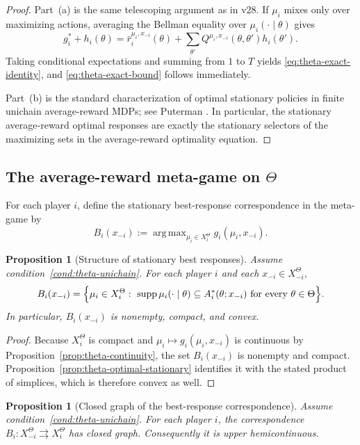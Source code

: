 \documentclass[11pt]{article}
\newtheorem{proposition}[theorem]{Proposition}
\theoremstyle{definition}
\newcommand{\1}{\mathbf{1}}
\DeclareMathOperator{\supp}{supp}
\DeclareMathOperator{\argmax}{arg\,max}
\begin{document}
\begin{proof}
Part~(a) is the same telescoping argument as in v28. If $\mu_i$ mixes only over maximizing actions, averaging the Bellman equality over $\mu_i(\cdot\mid \theta)$ gives
\[
g_i^*+h_i(\theta)
=
\bar r_i^{\mu_i,x_{-i}}(\theta)+\sum_{\theta'}Q^{\mu_i,x_{-i}}(\theta,\theta')h_i(\theta').
\]
Taking conditional expectations and summing from $1$ to $T$ yields \eqref{eq:theta-exact-identity}, and \eqref{eq:theta-exact-bound} follows immediately.

Part~(b) is the standard characterization of optimal stationary policies in finite unichain average-reward MDPs; see Puterman \cite[Chapter~8]{Puterman1994}. In particular, the stationary average-reward optimal responses are exactly the stationary selectors of the maximizing sets in the average-reward optimality equation.
\end{proof}

\subsection{The average-reward meta-game on $\Theta$}

For each player $i$, define the stationary best-response correspondence in the meta-game by
\[
B_i(x_{-i})
:=\argmax_{\mu_i\in X_i^\Theta}g_i(\mu_i,x_{-i}).
\]

\begin{proposition}[Structure of stationary best responses]\label{prop:theta-best-response-structure}
Assume condition~\ref{cond:theta-unichain}. For each player $i$ and each $x_{-i}\in X_{-i}^\Theta$,
\[
B_i(x_{-i})
=
\Bigl\{\mu_i\in X_i^\Theta:\ \supp\mu_i(\cdot\mid\theta)\subseteq A_i^*(\theta;x_{-i})\text{ for every }\theta\in\Theta\Bigr\}.
\]
In particular, $B_i(x_{-i})$ is nonempty, compact, and convex.
\end{proposition}

\begin{proof}
Because $X_i^\Theta$ is compact and $\mu_i\mapsto g_i(\mu_i,x_{-i})$ is continuous by Proposition~\ref{prop:theta-continuity}, the set $B_i(x_{-i})$ is nonempty and compact. Proposition~\ref{prop:theta-optimal-stationary} identifies it with the stated product of simplices, which is therefore convex as well.
\end{proof}

\begin{proposition}[Closed graph of the best-response correspondence]\label{prop:theta-best-response-closed}
Assume condition~\ref{cond:theta-unichain}. For each player $i$, the correspondence $B_i:X_{-i}^\Theta\rightrightarrows X_i^\Theta$ has closed graph. Consequently it is upper hemicontinuous.
\end{proposition}
\end{document}

